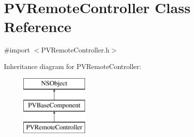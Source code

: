 \hypertarget{interface_p_v_remote_controller}{}\section{P\+V\+Remote\+Controller Class Reference}
\label{interface_p_v_remote_controller}


{\ttfamily \#import $<$P\+V\+Remote\+Controller.\+h$>$}

Inheritance diagram for P\+V\+Remote\+Controller\+:\begin{figure}[H]
\begin{center}
\leavevmode
\includegraphics[height=3.000000cm]{interface_p_v_remote_controller}
\end{center}
\end{figure}
